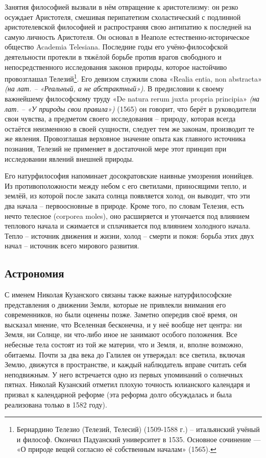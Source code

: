 \documentclass[
]{article}
\begin{document}
Занятия философией вызвали в нём отвращение к аристотелизму: он резко
осуждает Аристотеля, смешивая перипатетизм схоластический с подлинной
аристотелевской философией и распространяя свою антипатию к последней на
самую личность Аристотеля. Он основал в Неаполе естественно-историческое
общество Academia Telesiana. Последние годы его учёно-философской
деятельности протекли в тяжёлой борьбе против врагов свободного и
непосредственного исследования законов природы, которое настойчиво
провозглашал Телезий\footnote{Бернардино Телезио (Телезий, Телесий)
  (1509-1588 г.) -- итальянский учёный и философ. Окончил Падуанский
  университет в 1535. Основное сочинение --- «О природе вещей согласно
  её собственным началам» (1565).}. Его девизом служили слова «Realia
entia, non abstracta» \emph{(на лат. -- «Реальный, а не абстрактный»)}.
В предисловии к своему важнейшему философскому труду «De natura rerum
juxta propria principia» \emph{(на лат. -- «У природы свои правила»)}
(1565) он говорит, что берёт в руководители свои чувства, а предметом
своего исследования -- природу, которая всегда остаётся неизменною в
своей сущности, следует тем же законам, производит те же явления.
Провозглашая верховное значение опыта как главного источника познания,
Телезий не применяет в достаточной мере этот принцип при исследовании
явлений внешней природы.

Его натурфилософия напоминает досократовские наивные умозрения ионийцев.
Из противоположности между небом с его светилами, приносящими тепло, и
землёй, из которой после заката солнца появляется холод, он выводит, что
эти два начала -- первоосновные в природе. Кроме того, по словам
Телезия, есть нечто телесное (corporea moles), оно расширяется и
утончается под влиянием теплового начала и сжимается и сплачивается под
влиянием холодного начала. Тепло -- источник движения и жизни, холод --
смерти и покоя: борьба этих двух начал -- источник всего мирового
развития.

\hypertarget{ux430ux441ux442ux440ux43eux43dux43eux43cux438ux44f}{%
\subsection{Астрономия}\label{ux430ux441ux442ux440ux43eux43dux43eux43cux438ux44f}}

С именем Николая Кузанского связаны также важные натурфилософские
представления о движении Земли, которые не привлекли внимания его
современников, но были оценены позже. Заметно опередив своё время, он
высказал мнение, что Вселенная бесконечна, и у неё вообще нет центра: ни
Земля, ни Солнце, ни что-либо иное не занимают особого положения. Все
небесные тела состоят из той же материи, что и Земля, и, вполне
возможно, обитаемы. Почти за два века до Галилея он утверждал: все
светила, включая Землю, движутся в пространстве, и каждый наблюдатель
вправе считать себя неподвижным. У него встречается одно из первых
упоминаний о солнечных пятнах. Николай Кузанский отметил плохую точность
юлианского календаря и призвал к календарной реформе (эта реформа долго
обсуждалась и была реализована только в 1582 году).
\end{document}
